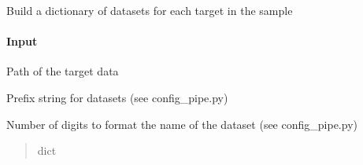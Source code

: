 \documentclass[letterpaper,10pt,english]{sphinxmanual}
\begin{document}
\begin{fulllineitems}
\label{\detokenize{api/pymusepipe:pymusepipe.util_pipe.build_dict_datasets}}
\pysigstartsignatures
{}
\pysigstopsignatures
\sphinxAtStartPar
Build a dictionary of datasets for each target in the sample


\paragraph{Input}
\label{\detokenize{api/pymusepipe:id161}}\begin{description}
\sphinxAtStartPar
Path of the target data

\sphinxAtStartPar
Prefix string for datasets (see config\_pipe.py)

\sphinxAtStartPar
Number of digits to format the name of the dataset (see config\_pipe.py)

\end{description}
\begin{quote}\begin{description}
\sphinxAtStartPar
{}

\sphinxAtStartPar
dict

\end{description}\end{quote}

\end{fulllineitems}

\end{document}

